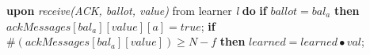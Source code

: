 \begin{algorithm}
\begin{algorithmic}[1]
		\State 
		\State \textbf{upon} \textit{receive(ACK, ballot, value)} from learner \textit{l} \textbf{do}
		\State \hspace{\algorithmicindent}\textbf{if} $ballot = bal_a$ \textbf{then}
		\State \hspace{\algorithmicindent}\hspace{\algorithmicindent} $ackMessages[bal_a][value][a] = true$;
		\State \hspace{\algorithmicindent}\hspace{\algorithmicindent} \textbf{if} $\#(ackMessages[bal_a][value]) \geq N-f$ \textbf{then}
		\State\hspace{\algorithmicindent}\hspace{\algorithmicindent} \hspace{\algorithmicindent} $learned = learned \bullet val$;
	\end{algorithmic}
\end{algorithm}